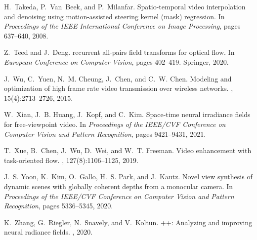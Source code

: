 \documentclass[12pt]{article}
\begin{document}
\begin{thebibliography}{10}
H.~Takeda, P.~Van~Beek, and P.~Milanfar.
\newblock Spatio-temporal video interpolation and denoising using
  motion-assisted steering kernel (mask) regression.
\newblock In {\em Proceedings of the IEEE International Conference on Image
  Processing}, pages 637--640, 2008.

Z.~Teed and J.~Deng.
 recurrent all-pairs field transforms for optical flow.
\newblock In {\em European Conference on Computer Vision}, pages 402--419.
  Springer, 2020.

J.~Wu, C.~Yuen, N.~M. Cheung, J.~Chen, and C.~W. Chen.
\newblock Modeling and optimization of high frame rate video transmission over
  wireless networks.
, 15(4):2713--2726,
  2015.

W.~Xian, J.~B. Huang, J.~Kopf, and C.~Kim.
\newblock Space-time neural irradiance fields for free-viewpoint video.
\newblock In {\em Proceedings of the IEEE/CVF Conference on Computer Vision and
  Pattern Recognition}, pages 9421--9431, 2021.

T.~Xue, B.~Chen, J.~Wu, D.~Wei, and W.~T. Freeman.
\newblock Video enhancement with task-oriented flow.
, 127(8):1106--1125,
  2019.

J.~S. Yoon, K.~Kim, O.~Gallo, H.~S. Park, and J.~Kautz.
\newblock Novel view synthesis of dynamic scenes with globally coherent depths
  from a monocular camera.
\newblock In {\em Proceedings of the IEEE/CVF Conference on Computer Vision and
  Pattern Recognition}, pages 5336--5345, 2020.

K.~Zhang, G.~Riegler, N.~Snavely, and V.~Koltun.
++: Analyzing and improving neural radiance fields.
, 2020.

\end{thebibliography}
\end{document}
